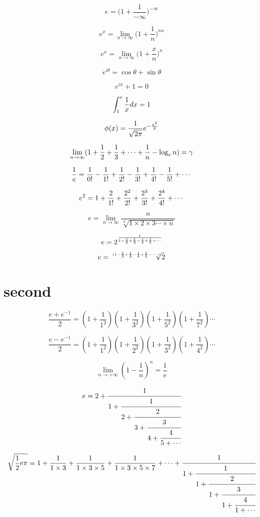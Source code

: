 $$ e =  \big(1+\frac{1}{-\infty }\big)^{-\infty} $$


$$ e^x = \lim_{n\rightarrow \infty} \big(1+\frac{1}{n}\big)^{nx} $$


$$ e^x = \lim_{n\rightarrow \infty} \big(1+\frac{x}{n}\big)^n $$

$$ e^{i\theta}  = \cos \theta + \sin \theta $$

$$ e^{i\pi} + 1 = 0 $$

$$  \int_1^e {1\over x} dx = 1 $$

$$  \phi(x) = {1 \over \sqrt{2\pi}} e^{-\frac{x^2}{2}} $$

$$ \lim_{n \rightarrow \infty} ( 1  + {1\over2} + {1\over3} + \cdots + {1\over n} - \log_e n ) =  \gamma  $$

$$ {1\over e} = {1 \over 0!}  - {1 \over 1!} + {1\over 2!} - {1\over 3!}  + {1\over 4!} -  {1\over 5!} + \cdots $$

$$ e^2 = 1 + {2 \over 1!} + {2^2\over 2!} + {2^3\over 3!} + {2^4\over 4!}  + \cdots $$

$$ e = \lim_{n \rightarrow \infty} \frac{n}{\sqrt[n]{1  \times 2  \times 3 \cdots \times n}} $$


$$ e = 2^{  \frac{1}{ 1- {1\over2} + {1\over3} - {1\over4}  + {1\over 5} - \cdots }  }  $$

$$ e = \sqrt[(1- {1\over2} + {1\over3} - {1\over4}  + {1\over 5} - \cdots) ]{2}  $$


\section{second}


$$  \frac{e+e^{-1}}{2} = (1+\frac{1}{1^2})(1+\frac{1}{3^2})(1+\frac{1}{5^2})(1+\frac{1}{7^2}) \cdots  $$

$$  \frac{e-e^{-1}}{2} = (1+\frac{1}{1^2})(1+\frac{1}{2^2})(1+\frac{1}{3^2})(1+\frac{1}{4^2}) \cdots  $$

$$ \lim_{n\rightarrow +\infty} (1-\frac{1}{n})^n  =  \frac{1}{e}  $$  

\begin{equation}
     e = 2+ \cfrac{1}{ 1 +
     \cfrac{1}{ 2 +
     \cfrac{2}{ 3 +
     \cfrac{3}{ 4 +
     \cfrac{4}{ 5 + \dotsb}}}}}
\end{equation}


$$  \sqrt{ {1\over2} e \pi}  = 1+{1 \over 1\times 3}  +{1 \over 1\times 3 \times 5} +  {1 \over 1\times 3 \times 5 \times 7} + \cdots +
\cfrac{1}{ 1 +
  \cfrac{1}{ 1 +
    \cfrac{2}{ 1 +
      \cfrac{3}{ 1 +
        \cfrac{4}{ 1 + \dotsb}}}}}
$$

